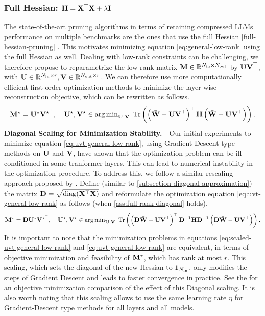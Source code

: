 \subsubsection{Full Hessian: $\mathbf{H} = \mathbf{X}^\top\mathbf{X} + \lambda \mathbf{I}$}
\vspace{-3pt}
The state-of-the-art pruning algorithms in terms of retaining compressed LLMs performance on multiple benchmarks are the ones that use the full Hessian \ref{full-hessian-pruning} \cite{meng2024alps,frantar2023sparsegpt}. This motivates minimizing equation \eqref{eq:general-low-rank} using the full Hessian as well.
Dealing with low-rank constraints can be challenging, we therefore propose to reparametrize the low-rank matrix $\mathbf{M} \in \mathbb{R}^{N_{\text{in}} \times N_{\text{out}}}$ by  $\mathbf{UV}^\top$, with $\mathbf{U} \in \mathbb{R}^{N_{\text{in}} \times r}, \mathbf{V} \in \mathbb{R}^{N_{\text{out}} \times r}$. We can therefore use more computationally efficient first-order optimization methods to minimize the layer-wise reconstruction objective, which can be rewritten as follows.
\begin{equation}\label{eq:uvt-general-low-rank}
    \bfM^\star = \bfU^\star \bfV^{\star^\top}, \quad \bfU^\star, \bfV^\star \in \argmin\nolimits_{\bfU, \bfV} \,\, \Tr{\pr{\lowrankW - \bfUVt}^\top \bfH \pr{\lowrankW - \bfUVt}}.
\end{equation}
\textbf{Diagonal Scaling for \Ptwo Minimization Stability.\,\,\,\,}\label{scaling-low-rank}
Our initial experiments to minimize equation \eqref{eq:uvt-general-low-rank}, using Gradient-Descent type methods on $\mathbf{U}$ and $\mathbf{V}$, have shown that the optimization problem can be ill-conditioned in some tranformer layers. This can lead to numerical instability in the optimization procedure. To address this, we follow a similar rescaling approach proposed by \citet{meng2024alps}. Define (similar to \ref{subsection-diagonal-approximation}) the matrix $\mathbf{D} = \sqrt{\operatorname{diag}({\mathbf{X}^\top\mathbf{X}})}$ and reformulate the optimization equation \eqref{eq:uvt-general-low-rank} as follows (when \cref{ass:full-rank-diagonal} holds).
\begin{equation}\label{eq:scaled-uvt-general-low-rank}
    \bfM^\star = \bfD\bfU^\star \bfV^{\star^\top}, \quad \bfU^\star, \bfV^\star \in \argmin\nolimits_{\bfU, \bfV} \,\, \Tr{\pr{\bfD\lowrankW - \bfUVt}^\top \bfD^{-1}\bfH\bfD^{-1} \pr{\bfD\lowrankW - \bfUVt}}.
\end{equation}
It is important to note that the minimization problems in equations \eqref{eq:scaled-uvt-general-low-rank} and \eqref{eq:uvt-general-low-rank} are equivalent, in terms of objective minimization and feasibility of $\mathbf{M}^\star$, which has rank at most $r$. This scaling, which sets the diagonal of the new Hessian to $\mathbf{1}_{N_{\text{in}}}$, only modifies the steps of Gradient Descent and leads to faster convergence in practice. See the  for an objective minimization comparison of the effect of this Diagonal scaling.
It is also worth noting that this scaling allows to use the same learning rate $\eta$ for Gradient-Descent type methods for all layers and all models.

